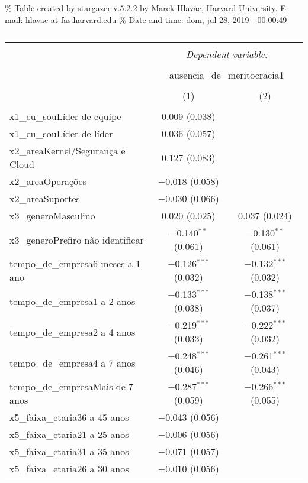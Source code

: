 \documentclass[]{book}
\begin{document}
\% Table created by stargazer v.5.2.2 by Marek Hlavac, Harvard University. E-mail: hlavac at fas.harvard.edu
\% Date and time: dom, jul 28, 2019 - 00:00:49

\begin{table}[!htbp] \centering 
  \caption{} 
  \label{} 
\begin{tabular}{@{\extracolsep{5pt}}lcc} 
\\[-1.8ex]\hline 
\hline \\[-1.8ex] 
 & \multicolumn{2}{c}{\textit{Dependent variable:}} \\ 
\cline{2-3} 
\\[-1.8ex] & \multicolumn{2}{c}{ausencia\_de\_meritocracia1} \\ 
\\[-1.8ex] & (1) & (2)\\ 
\hline \\[-1.8ex] 
 x1\_eu\_souLíder de equipe & 0.009 (0.038) &  \\ 
  x1\_eu\_souLíder de líder & 0.036 (0.057) &  \\ 
  x2\_areaKernel/Segurança e Cloud & 0.127 (0.083) &  \\ 
  x2\_areaOperações & $-$0.018 (0.058) &  \\ 
  x2\_areaSuportes & $-$0.030 (0.066) &  \\ 
  x3\_generoMasculino & 0.020 (0.025) & 0.037 (0.024) \\ 
  x3\_generoPrefiro não identificar & $-$0.140$^{**}$ (0.061) & $-$0.130$^{**}$ (0.061) \\ 
  tempo\_de\_empresa6 meses a 1 ano & $-$0.126$^{***}$ (0.032) & $-$0.132$^{***}$ (0.032) \\ 
  tempo\_de\_empresa1 a 2 anos & $-$0.133$^{***}$ (0.038) & $-$0.138$^{***}$ (0.037) \\ 
  tempo\_de\_empresa2 a 4 anos & $-$0.219$^{***}$ (0.033) & $-$0.222$^{***}$ (0.032) \\ 
  tempo\_de\_empresa4 a 7 anos & $-$0.248$^{***}$ (0.046) & $-$0.261$^{***}$ (0.043) \\ 
  tempo\_de\_empresaMais de 7 anos & $-$0.287$^{***}$ (0.059) & $-$0.266$^{***}$ (0.055) \\ 
  x5\_faixa\_etaria36 a 45 anos & $-$0.043 (0.056) &  \\ 
  x5\_faixa\_etaria21 a 25 anos & $-$0.006 (0.056) &  \\ 
  x5\_faixa\_etaria31 a 35 anos & $-$0.071 (0.057) &  \\ 
  x5\_faixa\_etaria26 a 30 anos & $-$0.010 (0.056) &  \\ 

\end{tabular}
\end{table}
\end{document}
